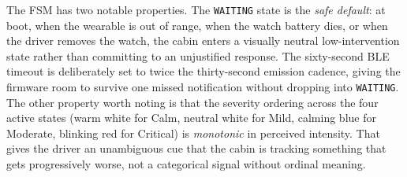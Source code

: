 The FSM has two notable properties. The \texttt{WAITING} state is
the \emph{safe default}: at boot, when the wearable is out of range,
when the watch battery dies, or when the driver removes the watch,
the cabin enters a visually neutral low-intervention state rather than
committing to an unjustified response. The sixty-second BLE timeout
is deliberately set to twice the thirty-second emission cadence, giving
the firmware room to survive one missed notification without dropping
into \texttt{WAITING}. The other property worth noting is that the
severity ordering across the four active states (warm white for Calm,
neutral white for Mild, calming blue for Moderate, blinking red for
Critical) is \emph{monotonic} in perceived intensity. That gives the
driver an unambiguous cue that the cabin is tracking something that
gets progressively worse, not a categorical signal without ordinal
meaning.
